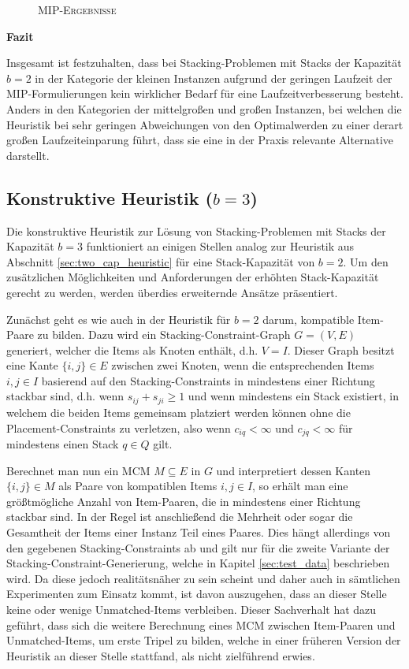 \begin{figure}[H]
\caption{\textsc{MIP-Ergebnisse}}
\label{fig:res_b=2_l}
\end{figure}

\textbf{Fazit}

Insgesamt ist festzuhalten, dass bei Stacking-Problemen mit Stacks der Kapazität $b = 2$ in der Kategorie der kleinen Instanzen
aufgrund der geringen Laufzeit der MIP-Formulierungen kein wirklicher Bedarf für eine Laufzeitverbesserung besteht.
Anders in den Kategorien der mittelgroßen und großen Instanzen, bei welchen die Heuristik bei sehr geringen Abweichungen
von den Optimalwerden zu einer derart großen Laufzeiteinparung führt, dass sie eine in der Praxis relevante Alternative darstellt.

\subsection{Konstruktive Heuristik ($b = 3$)}
\label{sec:three_cap_heuristic}

Die konstruktive Heuristik zur Lösung von Stacking-Problemen mit Stacks der Kapazität $b = 3$ funktioniert
an einigen Stellen analog zur Heuristik aus Abschnitt \ref{sec:two_cap_heuristic} für eine Stack-Kapazität von $b = 2$.
Um den zusätzlichen Möglichkeiten und Anforderungen der erhöhten Stack-Kapazität gerecht zu werden, werden überdies
erweiternde Ansätze präsentiert.

Zunächst geht es wie auch in der Heuristik für $b = 2$ darum, kompatible Item-Paare zu bilden. Dazu wird ein
Stacking-Constraint-Graph $G = (V, E)$ generiert, welcher die Items als Knoten enthält, d.h. $V = I$.
Dieser Graph besitzt eine Kante $\{i, j\} \in E$ zwischen zwei Knoten, wenn die entsprechenden Items $i, j \in I$
basierend auf den Stacking-Constraints in mindestens einer Richtung stackbar sind, d.h. wenn $s_{ij} + s_{ji} \geq 1$
und wenn mindestens ein Stack existiert, in welchem die beiden Items gemeinsam platziert werden können ohne die Placement-Constraints
zu verletzen, also wenn $c_{iq} < \infty$ und $c_{jq} < \infty$ für mindestens einen Stack $q \in Q$ gilt.

Berechnet man nun ein \textsc{MCM} $M \subseteq E$ in $G$ und interpretiert dessen Kanten $\{i, j\} \in M$ als Paare von kompatiblen Items
$i, j \in I$, so erhält man eine größtmögliche Anzahl von Item-Paaren, die in mindestens einer Richtung stackbar sind.
In der Regel ist anschließend die Mehrheit oder sogar die Gesamtheit der Items einer Instanz Teil eines Paares.
Dies hängt allerdings von den gegebenen Stacking-Constraints ab und gilt nur für die zweite Variante der Stacking-Constraint-Generierung, welche in Kapitel \ref{sec:test_data} beschrieben wird. Da diese jedoch realitätsnäher zu sein scheint und daher auch in sämtlichen Experimenten zum Einsatz kommt, ist davon auszugehen, dass an dieser Stelle keine oder wenige Unmatched-Items verbleiben.
Dieser Sachverhalt hat dazu geführt, dass sich die weitere Berechnung eines \textsc{MCM} zwischen Item-Paaren und Unmatched-Items,
um erste Tripel zu bilden, welche in einer früheren Version der Heuristik an dieser Stelle stattfand, als nicht zielführend
erwies.

